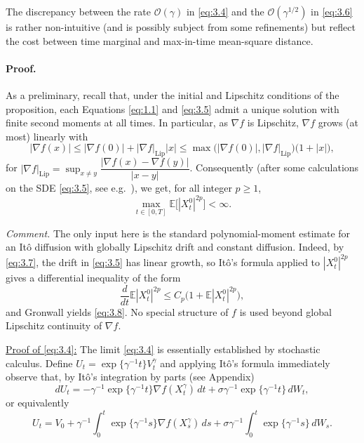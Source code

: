 \documentclass[11pt]{article}
\begin{document}
\begin{remark}
The discrepancy between the rate $\mathcal{O}(\gamma)$ in \eqref{eq:3.4} and the $\mathcal{O}(\gamma^{1/2})$ in \eqref{eq:3.6} is rather non-intuitive (and is possibly subject from some refinements) but reflect the cost between time marginal and max-in-time mean-square distance.
\end{remark}

\paragraph{Proof.}
As a preliminary, recall that, under the initial and Lipschitz conditions of the proposition, each Equations \eqref{eq:1.1} and \eqref{eq:3.5} admit a unique solution with finite second moments at all times.
In particular, as $\nabla f$ is Lipschitz, $\nabla f$ grows (at most) linearly with
\begin{equation}
\label{eq:3.7}
|\nabla f(x)| \le |\nabla f(0)| + |\nabla f|_{\mathrm{Lip}}|x|
\le \max\bigl(|\nabla f(0)|,|\nabla f|_{\mathrm{Lip}}\bigr)\bigl(1+|x|\bigr),
\end{equation}
for $|\nabla f|_{\mathrm{Lip}}=\sup_{x\neq y}\dfrac{|\nabla f(x)-\nabla f(y)|}{|x-y|}$.
Consequently (after some calculations on the SDE \eqref{eq:3.5}, see e.g.~\cite{ks91}), we get, for all integer $p\ge1$,
\begin{equation}
\label{eq:3.8}
\max_{t\in[0,T]}\mathbb{E}\bigl[|X_t^0|^{2p}\bigr]<\infty.
\end{equation}

{\color{teal}
\noindent\emph{Comment.} The only input here is the standard polynomial-moment estimate for an It\^o diffusion with globally Lipschitz drift and constant diffusion. Indeed, by \eqref{eq:3.7}, the drift in \eqref{eq:3.5} has linear growth, so It\^o's formula applied to $|X_t^0|^{2p}$ gives a differential inequality of the form
\[
\frac{d}{dt}\mathbb{E}|X_t^0|^{2p}\le C_p\bigl(1+\mathbb{E}|X_t^0|^{2p}\bigr),
\]
and Gronwall yields \eqref{eq:3.8}. No special structure of $f$ is used beyond global Lipschitz continuity of $\nabla f$.
}


\underline{Proof of \eqref{eq:3.4}:}
The limit \eqref{eq:3.4} is essentially established by stochastic calculus. Define $U_t=\exp\{\gamma^{-1}t\}V_t^{\gamma}$
and applying It\^o's formula immediately observe that, by It\^o's integration by parts (see Appendix)
\[
dU_t=-\gamma^{-1}\exp\{\gamma^{-1}t\}\nabla f(X_t^{\gamma})\,dt+\sigma\gamma^{-1}\exp\{\gamma^{-1}t\}\,dW_t,
\]
or equivalently
\[
U_t=V_0+\gamma^{-1}\int_0^t \exp\{\gamma^{-1}s\}\nabla f(X_s^{\gamma})\,ds+\sigma\gamma^{-1}\int_0^t \exp\{\gamma^{-1}s\}\,dW_s.
\]
\end{document}
